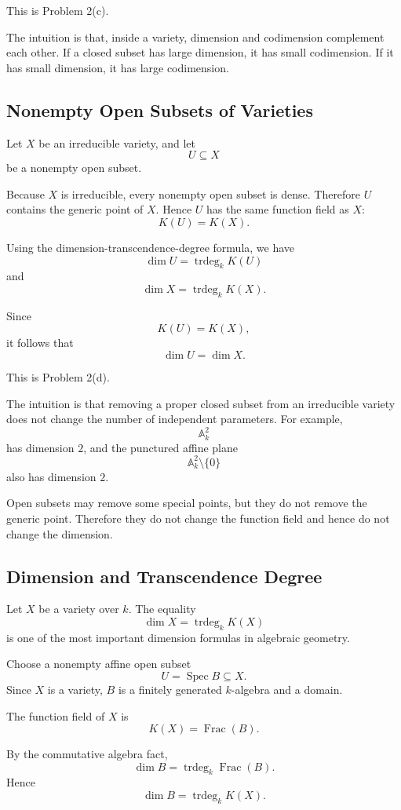 \documentclass[12pt,a4paper]{article}
\DeclareMathOperator{\Spec}{Spec}
\newcommand{\Frac}{\operatorname{Frac}}
\newcommand{\trdeg}{\operatorname{trdeg}}
\providecommand{\Spec}{\operatorname{Spec}}
\theoremstyle{notespace}
\begin{document}
This is Problem 2(c).

The intuition is that, inside a variety, dimension and codimension complement each other. If a closed subset has large dimension, it has small codimension. If it has small dimension, it has large codimension.

\subsection{Nonempty Open Subsets of Varieties}

Let \(X\) be an irreducible variety, and let
\[
U\subseteq X
\]
be a nonempty open subset.

Because \(X\) is irreducible, every nonempty open subset is dense. Therefore \(U\) contains the generic point of \(X\). Hence \(U\) has the same function field as \(X\):
\[
K(U)=K(X).
\]

Using the dimension-transcendence-degree formula, we have
\[
\dim U=\trdeg_k K(U)
\]
and
\[
\dim X=\trdeg_k K(X).
\]

Since
\[
K(U)=K(X),
\]
it follows that
\[
\boxed{
	\dim U=\dim X.
}
\]

This is Problem 2(d).

The intuition is that removing a proper closed subset from an irreducible variety does not change the number of independent parameters. For example,
\[
\mathbb A^2_k
\]
has dimension \(2\), and the punctured affine plane
\[
\mathbb A^2_k\setminus\{0\}
\]
also has dimension \(2\).

Open subsets may remove some special points, but they do not remove the generic point. Therefore they do not change the function field and hence do not change the dimension.

\subsection{Dimension and Transcendence Degree}

Let \(X\) be a variety over \(k\). The equality
\[
\dim X=\trdeg_k K(X)
\]
is one of the most important dimension formulas in algebraic geometry.

Choose a nonempty affine open subset
\[
U=\Spec B\subseteq X.
\]
Since \(X\) is a variety, \(B\) is a finitely generated \(k\)-algebra and a domain.

The function field of \(X\) is
\[
K(X)=\Frac(B).
\]

By the commutative algebra fact,
\[
\dim B=\trdeg_k \Frac(B).
\]
Hence
\[
\dim B=\trdeg_k K(X).
\]
\end{document}
